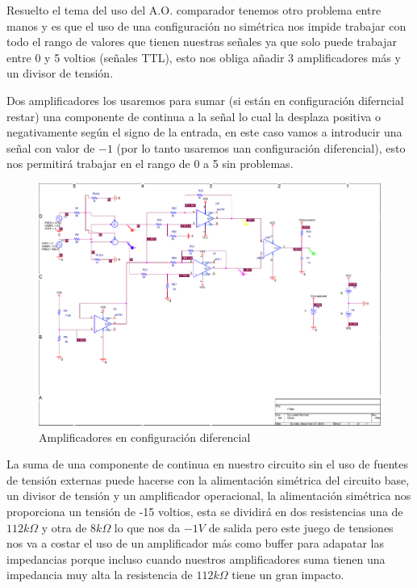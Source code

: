 {  Resuelto el tema del uso del A.O. comparador tenemos otro problema
  entre manos y es que el uso de una configuración no simétrica nos
  impide trabajar con todo el rango de valores que tienen nuestras
  señales ya que solo puede trabajar entre 0 y 5 voltios
  (señales TTL),   esto nos obliga añadir 3 amplificadores más y un divisor de tensión.
  
  Dos amplificadores los usaremos para sumar (si están en
  configuración diferncial restar) una componente de continua a la
  señal lo cual la desplaza positiva o negativamente según el signo de
  la entrada, en este caso vamos a introducir una señal con valor de
  $-1$ (por lo tanto usaremos uan configuración diferencial), esto nos permitirá trabajar en el rango de 0 a 5 sin
  problemas.

    \begin{figure}[H]
    \centering  
    \includegraphics[scale=0.8,page=1,clip, trim=12cm 11.5cm 12cm 0.5cm]{images/problema_puntuable_6_sche.pdf}
    \caption{Amplificadores en configuración diferencial}
  \end{figure}

  La suma de una componente de continua en nuestro circuito sin el uso
  de fuentes de tensión externas puede hacerse con la alimentación
  simétrica del circuito base, un divisor de tensión y un amplificador
  operacional, la alimentación simétrica nos proporciona un tensión de
  -15 voltios, esta se dividirá en dos resistencias una de $112k\Omega$
  y otra de $8k\Omega$ lo que nos da $-1 V$ de salida pero este juego
  de tensiones nos va a costar el uso de un amplificador más como
  buffer para adapatar las impedancias porque incluso cuando nuestros
  amplificadores suma tienen una impedancia muy alta la resistencia de
  $112k\Omega$ tiene un gran impacto.

}
